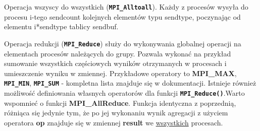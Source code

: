 Operacja wszyscy do wszystkich (\texttt{\textbf{MPI\_Alltoall}}). Każdy z procesów wysyła do procesu i-tego sendcount kolejnych elementów typu sendtype, poczynając od elementu i*sendtype tablicy sendbuf.
 
Operacja redukcji (\texttt{\textbf{MPI\_Reduce}}) służy do wykonywania globalnej operacji na elementach procesów należących do grupy. Pozwala wykonać na przykład sumowanie wszystkich częściowych wyników otrzymanych w procesach i umieszczenie wyniku w zmiennej. Przykładowe operatory to \textbf{MPI\_MAX}, \texttt{\textbf{MPI\_MIN}}, \texttt{\textbf{MPI\_SUM}} - kompletna lista znajduje się w dokumentacji. Istnieje również możliwość definiowania własnych operatorów dla funkcji \texttt{\textbf{MPI\_Reduce()}}.Warto wspomnieć o funkcji \textbf{MPI\_AllReduce}. Funkcja identyczna z poprzednią, różniąca się jedynie tym, że po jej wykonaniu wynik agregacji z użyciem operatora \textbf{op} znajduje się w zmiennej \textbf{result} we \underline{wszystkich} procesach.
